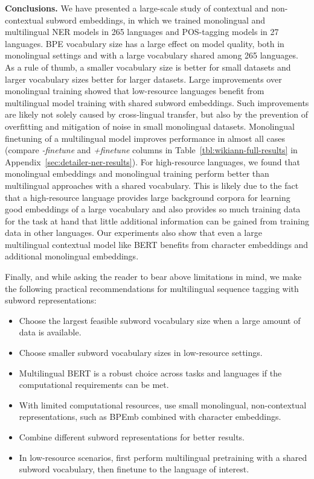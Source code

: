 \documentclass[11pt,a4paper]{article}
\begin{document}
\noindent\textbf{Conclusions.} We have presented a large-scale study of contextual and non-contextual subword embeddings, in which we trained monolingual and multilingual NER models in 265 languages and POS-tagging models in 27 languages.
BPE vocabulary size has a large effect on model quality, both in monolingual settings and with a large vocabulary shared among 265 languages.
As a rule of thumb, a smaller vocabulary size is better for small datasets and larger vocabulary sizes better for larger datasets.
Large improvements over monolingual training showed that low-resource languages benefit from multilingual model training with shared subword embeddings.
Such improvements are likely not solely caused by cross-lingual transfer, but also by the prevention of overfitting and mitigation of noise in small monolingual datasets.
Monolingual finetuning of a multilingual model improves performance in almost all cases (compare \emph{-finetune} and \emph{+finetune} columns in Table~\ref{tbl:wikiann-full-results} in Appendix~\ref{sec:detailer-ner-results}).
For high-resource languages, we found that monolingual embeddings and monolingual training perform better than multilingual approaches with a shared vocabulary.
This is likely due to the fact that a high-resource language provides large background corpora for learning good embeddings of a large vocabulary and also provides so much training data for the task at hand that little additional information can be gained from training data in other languages.
Our experiments also show that even a large multilingual contextual model like BERT benefits from character embeddings and additional monolingual embeddings.

Finally, and while asking the reader to bear above limitations in mind, we make the following practical recommendations for multilingual sequence tagging with subword representations:
\begin{itemize}
	\item Choose the largest feasible subword vocabulary size when a large amount of data is available.
	\item Choose smaller subword vocabulary sizes in low-resource settings.
	\item Multilingual BERT is a robust choice across tasks and languages if the computational requirements can be met.
	\item With limited computational resources, use small monolingual, non-contextual representations, such as BPEmb combined with character embeddings.
	\item Combine different subword representations for better results.
	\item In low-resource scenarios, first perform multilingual pretraining with a shared subword vocabulary, then finetune to the language of interest.
\end{itemize}
\end{document}
